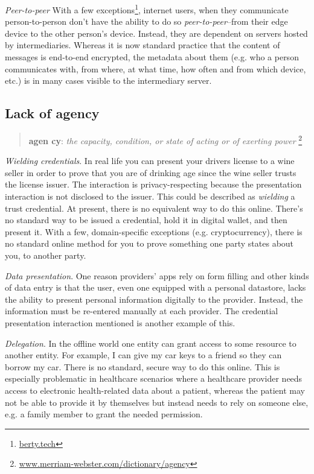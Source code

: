 \documentclass[11pt, oneside]{article}   	%
\newcommand{\hyperfootnote}[1][]{\def\ArgI{{#1}}\hyperfootnoteRelay}
\newcommand\hyperfootnoteRelay[2][]{\href{#1#2}{\ArgI}\footnote{\href{#1#2}{#2}}}
\begin{document}
\emph{Peer-to-peer} With a few exceptions\hyperfootnote[][https://]{berty.tech}, internet users, when they communicate person-to-person don't have the ability to do so \emph{peer-to-peer}--from their edge device to the other person's device. Instead, they are dependent on servers hosted by intermediaries. Whereas it is now standard practice that the content of messages is end-to-end encrypted, the metadata about them (e.g. who a person communicates with, from where, at what time, how often and from which device, etc.) is in many cases visible to the intermediary server. 

\subsection{Lack of agency}

\begin{quote}
\textbf{a\hspace{0.5mm}\tiny {}\normalsize \hspace{0.5mm}gen \tiny {} \normalsize cy}: \emph{the capacity, condition, or state of acting or of exerting power} \hyperfootnote[][https://]{www.merriam-webster.com/dictionary/agency}
\end{quote}

\emph{Wielding credentials}. In real life you can present your drivers license to a wine seller in order to prove that you are of drinking age since the wine seller trusts the license issuer. The interaction is privacy-respecting because the presentation interaction is not disclosed to the issuer. This could be described as \emph{wielding} a trust credential. At present, there is no equivalent way to do this online. There's no standard way to be issued a credential, hold it in digital wallet, and then present it. With a few, domain-specific exceptions (e.g. cryptocurrency), there is no standard online method for you to prove something one party states about you, to another party.

\emph{Data presentation}. One reason providers' apps rely on form filling and other kinds of data entry is that the user, even one equipped with a personal datastore, lacks the ability to present personal information digitally to the provider. Instead, the information must be re-entered manually at each provider. The credential presentation interaction mentioned is another example of this.

\emph{Delegation}. In the offline world one entity can grant access to some resource to another entity. For example, I can give my car keys to a friend so they can borrow my car. There is no standard, secure way to do this online. This is especially problematic in healthcare scenarios where a healthcare provider needs access to electronic health-related data about a patient, whereas the patient may not be able to provide it by themselves but instead needs to rely on someone else, e.g. a family member to grant the needed permission.
\end{document}
